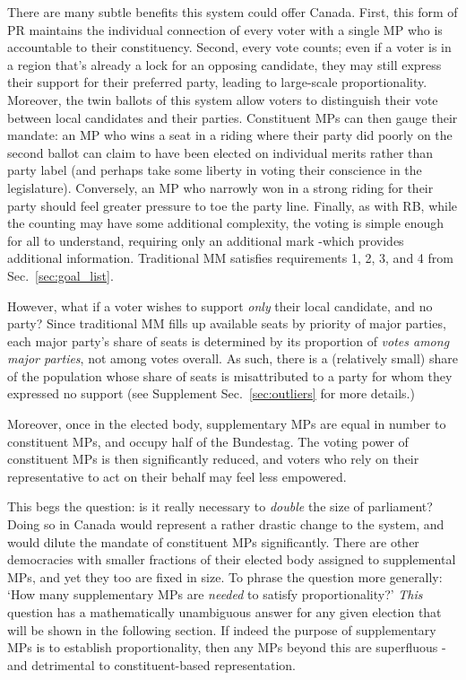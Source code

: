There are many subtle benefits this system could offer Canada.
First, this form of PR maintains the individual connection of every voter with a single MP who is accountable to their constituency.
Second, every vote counts; even if a voter is in a region that's already a lock for an opposing candidate, they may still express their support for their preferred party, leading to large-scale proportionality.
Moreover, the twin ballots of this system allow voters to distinguish their vote between local candidates and their parties.
Constituent MPs can then gauge their mandate: an MP who wins a seat in a riding where their party did poorly on the second ballot can claim to have been elected on individual merits rather than party label (and perhaps take some liberty in voting their conscience in the legislature). Conversely, an MP who narrowly won in a strong riding for their party should feel greater pressure to toe the party line.
Finally, as with RB, while the counting may have some additional complexity, the voting is simple enough for all to understand, requiring only an additional mark \--which provides additional information. Traditional MM satisfies requirements 1, 2, 3, and 4 from Sec.~\ref{sec:goal_list}.

However, what if a voter wishes to support \emph{only} their local candidate, and no party? Since traditional MM fills up available seats by priority of major parties, each major party's share of seats is determined by its proportion of \emph{votes among major parties}, not among votes overall. As such, there is a (relatively small) share of the population whose share of seats is misattributed to a party for whom they expressed no support (see Supplement Sec.~\ref{sec:outliers} for more details.)

Moreover, once in the elected body, supplementary MPs are equal in number to constituent MPs, and occupy half of the Bundestag.
The voting power of constituent MPs is then significantly reduced, and voters who rely on their representative to act on their behalf may feel less empowered.

This begs the question: is it really necessary to \emph{double} the size of parliament? Doing so in Canada would represent a rather drastic change to the system, and would dilute the mandate of constituent MPs significantly.
There are other democracies with smaller fractions of their elected body assigned to supplemental MPs, and yet they too are fixed in size.
To phrase the question more generally: `How many supplementary MPs are \emph{needed} to satisfy proportionality?'
\emph{This} question has a mathematically unambiguous answer for any given election that will be shown in the following section.
If indeed the purpose of supplementary MPs is to establish proportionality, then any MPs beyond this are superfluous \--and detrimental to constituent-based representation.

